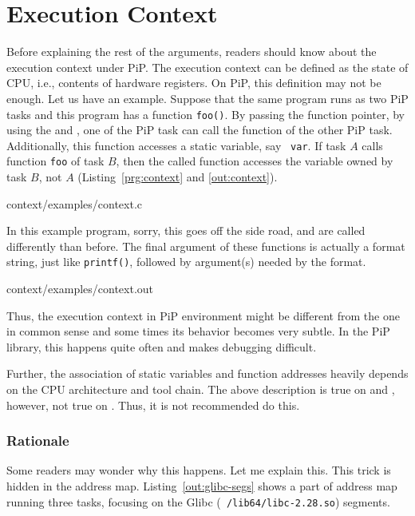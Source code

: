 
\section{Execution Context}\label{sec:context}

Before explaining the rest of the arguments, readers should know about
the execution context under PiP. The execution context can be defined
as the state of CPU, i.e., contents of hardware registers. On PiP,
this definition may not be enough. Let us have an example. Suppose
that the same program runs as two PiP tasks and this program has a
function {\tt foo()}. By passing the function pointer, by using the
 and , one of
the PiP task can call the function of the other PiP
task. Additionally, this function accesses a static variable, say {\tt
  var}. If task $A$ calls function {\tt foo} of task $B$, then the
called function accesses the variable owned by task $B$, not $A$
(Listing~\ref{prg:context} and \ref{out:context}).

 {context/examples/context.c}

In this example program, sorry, this goes off the side road,
 and 
 are called differently than
before. The final argument of these functions is actually a format
string, just like {\tt printf()}, followed by argument(s) needed by
the format. 


                {context/examples/context.out}

Thus, the execution context in PiP environment might be different from
the one in common sense and some times its behavior becomes very
subtle. In the PiP library, this happens quite often and makes
debugging difficult. 

Further, the association of static variables and function addresses
heavily depends on the CPU architecture and tool chain. The above
description is true on  and ,
however, not true on . Thus, it is not recommended
do this. 

\subsubsection*{Rationale}

Some readers may wonder why this happens. Let me explain this. This
trick is hidden in the address map. Listing~\ref{out:glibc-segs} shows
a part of address map running three tasks, focusing on the Glibc ({\tt
  /lib64/libc-2.28.so}) segments. 

